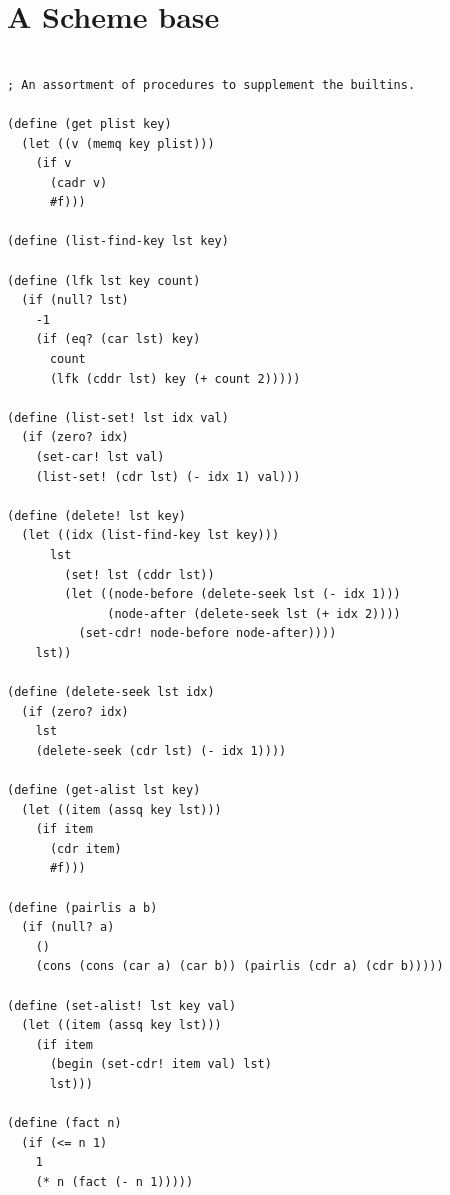 \documentclass[twoside,9pt]{report}
\begin{document}
\section{A Scheme base}
\label{a-scheme-base}
\noindent\makebox[\linewidth]{\rule{\linewidth}{0.4pt}}
\begin{lstlisting}
 
; An assortment of procedures to supplement the builtins.
 
(define (get plist key)
  (let ((v (memq key plist)))
    (if v
      (cadr v)
      #f)))
 
(define (list-find-key lst key)
 
(define (lfk lst key count)
  (if (null? lst)
    -1
    (if (eq? (car lst) key)
      count
      (lfk (cddr lst) key (+ count 2)))))
 
(define (list-set! lst idx val)
  (if (zero? idx)
    (set-car! lst val)
    (list-set! (cdr lst) (- idx 1) val)))
 
(define (delete! lst key)
  (let ((idx (list-find-key lst key)))
      lst
        (set! lst (cddr lst))
        (let ((node-before (delete-seek lst (- idx 1)))
              (node-after (delete-seek lst (+ idx 2))))
          (set-cdr! node-before node-after))))
    lst))
 
(define (delete-seek lst idx)
  (if (zero? idx)
    lst
    (delete-seek (cdr lst) (- idx 1))))
 
(define (get-alist lst key)
  (let ((item (assq key lst)))
    (if item
      (cdr item)
      #f)))
 
(define (pairlis a b)
  (if (null? a)
    ()
    (cons (cons (car a) (car b)) (pairlis (cdr a) (cdr b)))))
 
(define (set-alist! lst key val)
  (let ((item (assq key lst)))
    (if item
      (begin (set-cdr! item val) lst)
      lst)))
 
(define (fact n)
  (if (<= n 1)
    1
    (* n (fact (- n 1)))))
 
\end{lstlisting}
\noindent\makebox[\linewidth]{\rule{\linewidth}{0.4pt}}
\end{document}
